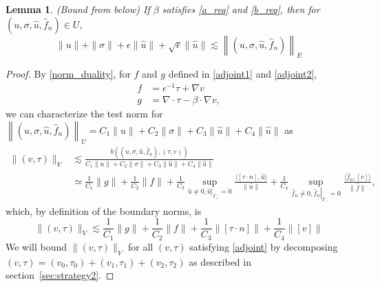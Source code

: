 \documentclass[11pt,onecolumn]{scrartcl}
\newcommand{\grad}{\nabla}
\renewcommand{\div}{\grad \cdot}
\newtheorem{lemma}{Lemma}
\begin{document}
\begin{lemma}
\label{bound_from_below}
(Bound from below) If $\beta$ satisfies \eqref{a_req} and \eqref{b_req}, then for $\left(u,\sigma,\widehat{u},\widehat{f}_n\right) \in U$,
\[
\|u\| + \|\sigma\| + \epsilon\|\widehat{u}\|+ \sqrt{\epsilon}\|\widehat{u}\| \lesssim \left\|\left(u,\sigma,\widehat{u},\widehat{f}_n\right)\right\|_E
\]
\end{lemma}
\begin{proof}
By \eqref{norm_duality}, for $f$ and $g$ defined in \eqref{adjoint1} and \eqref{adjoint2},
\begin{align*}
f &= \epsilon^{-1}\tau + \grad v  \\
g &=\div \tau - \beta\cdot \grad v,
\end{align*} 
we can characterize the test norm for $\left\|\left(u,\sigma,\widehat{u},\widehat{f}_n\right)\right\|_U = C_1\|u\| + C_2\|\sigma\| + C_3\|\widehat{u}\|+ C_4\|\widehat{u}\|$ as
\begin{align*}
\|\left(v,\tau\right)\|_V &\lesssim \frac{b\left(\left(u,\sigma,\widehat{u},\widehat{f}_n\right),\left(\tau,v\right)\right)}{C_1\|u\| + C_2\|\sigma\| + C_3\|\widehat{u}\|+ C_4\|\widehat{u}\|}\\
& \simeq \frac{1}{C_1}\|g\| + \frac{1}{C_2}\|f\| + \frac{1}{C_3}\sup_{\widehat{u}\neq 0, \left.\widehat{u}\right|_{\Gamma_+} = 0} \frac{\langle [\tau\cdot n], \widehat{u}\rangle}{\|\widehat{u}\|} + \frac{1}{C_4}\sup_{\widehat{f}_n\neq 0, \left.\widehat{f}_n\right|_{\Gamma_-}=0}\frac{\langle \widehat{f}_n, [v]\rangle}{\|\widehat{f}\|},
\end{align*}
which, by definition of the boundary norms, is 
\[
\|\left(v,\tau\right)\|_V \lesssim \frac{1}{C_1}\|g\| + \frac{1}{C_2}\|f\| + \frac{1}{C_3}\|[\tau\cdot n]\| + \frac{1}{C_4}\|[v]\|
\]
We will bound $\|\left(v,\tau\right)\|_V$ for all $\left(v,\tau\right)$ satisfying \eqref{adjoint} by decomposing $\left(v,\tau\right) = \left(v_0,\tau_0\right) + \left(v_1,\tau_1\right) + \left(v_2,\tau_2\right)$ as described in section~\ref{sec:strategy2}.  

\end{proof}
\end{document}
